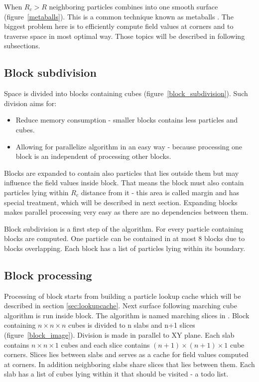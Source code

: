 When $R_c > R$ neighboring particles combines into one smooth surface  (figure~\ref{metaballs}). This is a common technique known as metaballs \cite{Blinn1982}. The biggest problem here is to efficiently compute field values at corners and to traverse space in most optimal way. Those topics will be described in following subsections.
 

\subsection{Block subdivision} \label{sec:block_subdivision}
Space is divided into blocks containing cubes (figure~\ref{block_subdivision}). Such division aims for:
\begin{itemize}
\item Reduce memory consumption - smaller blocks contains less particles and cubes. 
\item Allowing for parallelize algorithm in an easy way - because processing one block is an independent of processing other blocks. 
\end{itemize}
Blocks are expanded to contain also particles that lies outside them but may influence the field values inside block. That means the block must also contain particles lying within $R_c$ distance from it - this area is called margin and has special treatment, which will be described in next section. Expanding blocks makes parallel processing very easy as there are no dependencies between them.


Block subdivision is a first step of the algorithm. For every particle containing blocks are computed. One particle can be contained in at most 8 blocks due to blocks overlapping. Each block has a list of particles lying within its boundary. 

\subsection{Block processing} \label{sec:block_processing}
Processing of block starts from building a particle lookup cache which will be described in section \ref{sec:lookupcache}. Next surface following marching cube algorithm is run inside block. The algorithm is named marching slices in \cite{RosenbergBirdwell2008}. Block containing $n \times n \times n$ cubes is divided to n slabs and n+1 slices (figure~\ref{block_image}). Division is made in parallel to XY plane. Each slab contains $n \times n \times 1$ cubes and each slice contains $(n+1) \times (n+1) \times 1$ cube corners. Slices lies between slabs and serves as a cache for field values computed at corners. In addition neighboring slabs share slices that lies between them. Each slab has a list of cubes lying within it that should be visited - a todo list.

